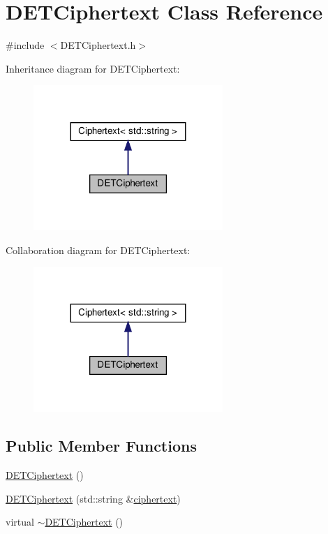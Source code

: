 \hypertarget{classDETCiphertext}{}\section{D\+E\+T\+Ciphertext Class Reference}
\label{classDETCiphertext}


{\ttfamily \#include $<$D\+E\+T\+Ciphertext.\+h$>$}



Inheritance diagram for D\+E\+T\+Ciphertext\+:
\nopagebreak
\begin{figure}[H]
\begin{center}
\leavevmode
\includegraphics[width=203pt]{classDETCiphertext__inherit__graph}
\end{center}
\end{figure}


Collaboration diagram for D\+E\+T\+Ciphertext\+:
\nopagebreak
\begin{figure}[H]
\begin{center}
\leavevmode
\includegraphics[width=203pt]{classDETCiphertext__coll__graph}
\end{center}
\end{figure}
\subsection*{Public Member Functions}
\begin{DoxyCompactItemize}
\item 
\hyperlink{classDETCiphertext_abf102b1ca2a4dc34ee71e4ed92df3977}{D\+E\+T\+Ciphertext} ()
\item 
\hyperlink{classDETCiphertext_a92b651e8e700ef303b0cb1d6a1995ba4}{D\+E\+T\+Ciphertext} (std\+::string \&\hyperlink{classCiphertext_adef9aae9d923eb100b4a1ad58ce495f1}{ciphertext})
\item 
virtual \hyperlink{classDETCiphertext_ae9a37b2c41fc81e8b8948d3bcf057cd6}{$\sim$\+D\+E\+T\+Ciphertext} ()
\end{DoxyCompactItemize}

